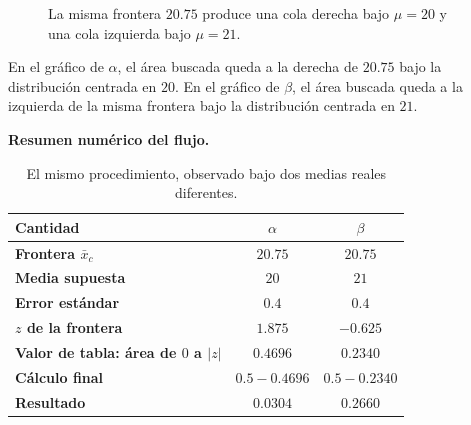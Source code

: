 \documentclass[11pt,a4paper]{article}
\begin{document}
\begin{figure}[H]
\begin{minipage}[t]{.48\textwidth}
\end{minipage}
\caption{La misma frontera $20.75$ produce una cola derecha bajo $\mu=20$ y una cola izquierda bajo $\mu=21$.}
\end{figure}

\begin{observargrafico}
En el gráfico de $\alpha$, el área buscada queda a la derecha de $20.75$ bajo la distribución centrada en $20$. En el gráfico de $\beta$, el área buscada queda a la izquierda de la misma frontera bajo la distribución centrada en $21$.
\end{observargrafico}

\medskip\noindent\textbf{Resumen numérico del flujo.}\par\smallskip
\begin{table}[H]
\centering
\small
\renewcommand{\arraystretch}{1.18}
\begin{tabular}{>{\bfseries}lcc}
\toprule
Cantidad & $\alpha$ & $\beta$\\
\midrule
Frontera $\bar{x}_c$ & $20.75$ & $20.75$\\
Media supuesta & $20$ & $21$\\
Error estándar & $0.4$ & $0.4$\\
$z$ de la frontera & $1.875$ & $-0.625$\\
Valor de tabla: área de $0$ a $|z|$ & $0.4696$ & $0.2340$\\
Cálculo final & $0.5-0.4696$ & $0.5-0.2340$\\
Resultado & \cellcolor{rejectred!14}$0.0304$ & \cellcolor{altorange!16}$0.2660$\\
\bottomrule
\end{tabular}
\caption{El mismo procedimiento, observado bajo dos medias reales diferentes.}
\end{table}
\end{document}
